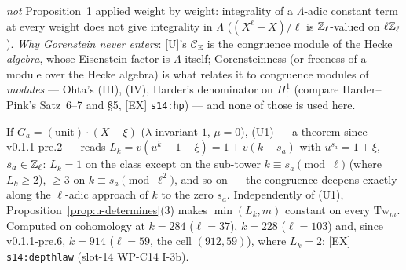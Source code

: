 \documentclass[11pt]{article}
\newcommand{\Iw}{\Lambda}                         %
\newcommand{\Eis}{\mathrm{E}}
\newcommand{\Cg}{\mathcal{C}}                     %
\newcommand{\Zl}{\Z_\ell}
\begin{document}
\begin{remark}
\emph{not} Proposition~1 applied weight by weight: integrality of a $\Iw$-adic constant term at every weight does not give integrality in $\Iw$ ($(X^{\ell}-X)/\ell$
is $\Zl$-valued on $\ell\Zl$). \emph{Why Gorenstein never enters}: [U]'s $\Cg_\Eis$ is the congruence module of the Hecke \emph{algebra}, whose Eisenstein factor is $\Iw$ itself;
Gorensteinness (or freeness of a module over the Hecke algebra) is what relates it to congruence modules of \emph{modules} --- Ohta's (III), (IV), Harder's
denominator on $H^{1}_{!}$ (compare Harder--Pink's Satz~6--7 and \S5, [EX] \texttt{s14:hp}) --- and none of those is used here.
\end{remark}

\begin{remark}\label{rmk:u-zero}
If $G_a=(\text{unit})\cdot(X-\xi)$ ($\lambda$-invariant $1$, $\mu=0$), (U1) --- a theorem since v0.1.1-pre.2 --- reads $L_k=v(u^{k}-1-\xi)=1+v(k-s_a)$ with $u^{s_a}=1+\xi$, $s_a\in\Zl$:
$L_k=1$ on the class except on the sub-tower $k\equiv s_a\pmod{\ell}$ (where $L_k\ge2$), $\ge3$ on $k\equiv s_a\pmod{\ell^{2}}$, and so on --- the
congruence deepens exactly along the $\ell$-adic approach of $k$ to the zero $s_a$. Independently of (U1), Proposition~\ref{prop:u-determines}(3) makes
$\min(L_k,m)$ constant on every $\mathrm{Tw}_m$. \COMP{} Computed on cohomology at $k=284$ ($\ell=37$), $k=228$ ($\ell=103$) and, since
v0.1.1-pre.6, $k=914$ ($\ell=59$, the cell $(912,59)$), where $L_k=2$: [EX] \texttt{s14:depthlaw} (slot-14 WP-C14 I-3b).
\end{remark}
\end{document}
